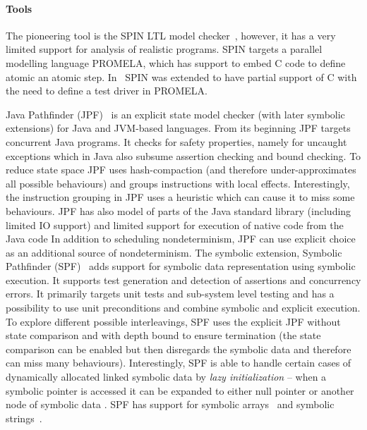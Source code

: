\paragraph{Tools}

The pioneering tool is the SPIN LTL model
checker~\cite{Holzmann1997,Holzmann2004}, however, it has a very limited
support for analysis of realistic programs.
SPIN targets a parallel modelling language PROMELA, which has support to embed
C code to define atomic an atomic step.
In~\cite{Zaks2008} SPIN was extended to have partial support of C with the need
to define a test driver in PROMELA.

Java Pathfinder (JPF)~\cite{Artho2019,Visser2003} is an explicit state model
checker (with later symbolic extensions) for Java and JVM-based
languages.
From its beginning JPF targets concurrent Java programs.
It checks for safety properties, namely for uncaught exceptions which in Java also subsume assertion checking and bound checking.
To reduce state space JPF uses hash-compaction (and therefore under-approximates all possible behaviours) and groups instructions with local effects.
Interestingly, the instruction grouping in JPF uses a heuristic which can cause it to miss some behaviours.
JPF has also model of parts of the Java standard library (including limited IO
support) and limited support for execution of native code from the Java
code
In addition to scheduling nondeterminism, JPF can use explicit choice as an
additional source of nondeterminism.
The symbolic extension, Symbolic Pathfinder (SPF)~\cite{Pasareanu2013,Noller2019} adds
support for symbolic data representation using symbolic execution.
It supports test generation and detection of assertions and concurrency errors.
It primarily targets unit tests and sub-system level testing and has a
possibility to use unit preconditions and combine symbolic and explicit
execution.
To explore different possible interleavings, SPF uses the explicit JPF without
state comparison and with depth bound to ensure termination (the state
comparison can be enabled but then disregards the symbolic data and therefore
can miss many behaviours).
Interestingly, SPF is able to handle certain cases of dynamically allocated
linked symbolic data by \emph{lazy initialization} -- when a symbolic pointer
is accessed it can be expanded to either null pointer or another node of
symbolic data \cite{Khurshid2003}.
SPF has support for symbolic arrays~\cite{Fromherz2017} and symbolic strings~\cite{Bang2016}.

